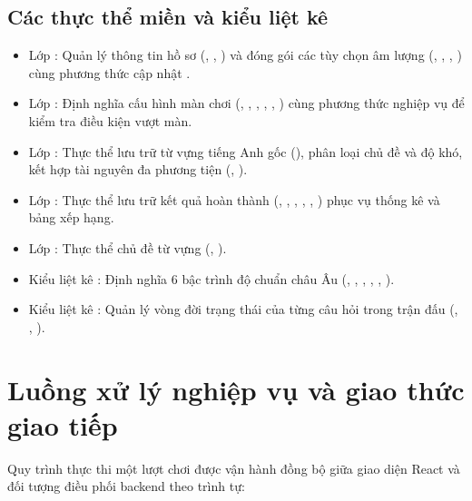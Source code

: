 \subsection{Các thực thể miền và kiểu liệt kê}
\label{subsec:domain_entities}
\begin{itemize}
    \item Lớp : Quản lý thông tin hồ sơ (, , ) và đóng gói các tùy chọn âm lượng (, , , ) cùng phương thức cập nhật .
    \item Lớp : Định nghĩa cấu hình màn chơi (, , , , , ) cùng phương thức nghiệp vụ  để kiểm tra điều kiện vượt màn.
    \item Lớp : Thực thể lưu trữ từ vựng tiếng Anh gốc (), phân loại chủ đề và độ khó, kết hợp tài nguyên đa phương tiện (, ).
    \item Lớp : Thực thể lưu trữ kết quả hoàn thành (, , , , , ) phục vụ thống kê và bảng xếp hạng.
    \item Lớp : Thực thể chủ đề từ vựng (, ).
    \item Kiểu liệt kê : Định nghĩa 6 bậc trình độ chuẩn châu Âu (, , , , , ).
    \item Kiểu liệt kê : Quản lý vòng đời trạng thái của từng câu hỏi trong trận đấu (, , ).
\end{itemize}

\section{Luồng xử lý nghiệp vụ và giao thức giao tiếp}
\label{sec:workflow}
Quy trình thực thi một lượt chơi được vận hành đồng bộ giữa giao diện React và đối tượng điều phối backend  theo trình tự:

